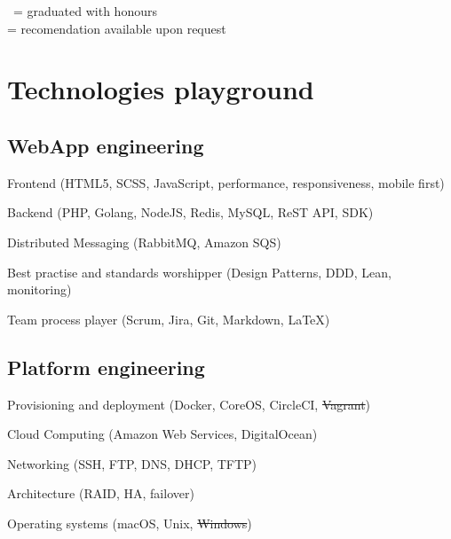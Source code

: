 \documentclass[letterpaper]{article}
\renewenvironment{itemize}{
    \begin{list}{}{
        \setlength{\leftmargin}{1.5em}
    }
}{
    \end{list}
}
\begin{document}
        \vfill

        \begin{flushright}
            \begin{footnotesize}
                \faTrophy\ = graduated with honours \\
                \faThumbsOUp = recomendation available upon request
            \end{footnotesize}
        \end{flushright}

    \section*{\faCode{} Technologies playground}

        \subsection*{WebApp engineering}

            \begin{itemize}
                \item Frontend (HTML5, SCSS, JavaScript, performance, responsiveness, mobile first)
                \item Backend (PHP, Golang, NodeJS, Redis, MySQL, ReST API, SDK)
                \item Distributed Messaging (RabbitMQ, Amazon SQS)
                \item Best practise and standards worshipper (Design Patterns, DDD, Lean, monitoring)
                \item Team process player (Scrum, Jira, Git, Markdown, \LaTeX)
            \end{itemize}

        \subsection*{Platform engineering}

            \begin{itemize}
                \item Provisioning and deployment (Docker, CoreOS, CircleCI, \sout{Vagrant})
                \item Cloud Computing (Amazon Web Services, DigitalOcean)
                \item Networking (SSH, FTP, DNS, DHCP, TFTP)
                \item Architecture (RAID, HA, failover)
                \item Operating systems (macOS, Unix, \sout{Windows})
            \end{itemize}
\end{document}
